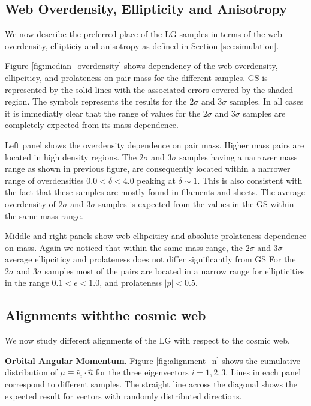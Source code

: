 \documentclass{emulateapj}
\begin{document}
\subsection{Web Overdensity, Ellipticity and Anisotropy}

We now describe the preferred place of the LG samples in terms of the
web overdensity, ellipticiy and anisotropy as defined in Section
\ref{sec:simulation}. 

Figure \ref{fig:median_overdensity} shows dependency of the web overdensity,
ellipciticy, and prolateness on pair mass for the different samples.
GS is represented by the solid lines with the associated 
errors covered by the shaded region. 
The symbols represents the results for the $2\sigma$ and $3\sigma$
samples.  
In all cases it is immediatly clear that the range of values for the
$2\sigma$ and $3\sigma$ samples are completely expected from its mass
dependence.  

Left panel shows the overdensity dependence on pair mass. 
Higher mass pairs are located in high density regions.
The $2\sigma$ and $3\sigma$ samples having a narrower mass range as 
shown in previous figure, are consequently located within a narrower 
range of overdensities $0.0<\delta<4.0$ peaking at $\delta \sim 1$. 
This is also consistent with the fact that these samples are mostly 
found in filaments and sheets. 
The average overdensity of $2\sigma$ and $3\sigma$ samples is expected
from the values in the GS within the same mass range.

Middle and right panels show web ellipciticy and absolute prolateness
dependence on mass. Again we noticed that within the same mass range,
the $2\sigma$ and $3\sigma$ average ellipciticy and prolateness does not
differ significantly from GS
For the $2\sigma$ and $3\sigma$ samples most of the pairs are located
in a narrow range for ellipticities in the range $0.1<e<1.0$, and
prolateness $|p|<0.5$.


\subsection{Alignments withthe cosmic web}

We now study different alignments of the LG with respect to the cosmic web. 

{\bf Orbital Angular Momentum}. Figure \ref{fig:alignment_n} shows the
cumulative distribution of $\mu\equiv\hat{e}_i\cdot\hat{n}$  for the
three eigenvectors $i=1,2,3$.    
Lines in each panel correspond to different samples.
The straight line across the diagonal shows the expected
result for vectors with randomly distributed directions.
\end{document}
